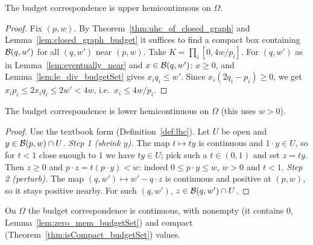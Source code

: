 \begin{theorem}
\label{thm:uhc_budget}
\leanok
{}
The budget correspondence is upper hemicontinuous on $\Omega$.
\end{theorem}
\begin{proof}
\leanok
Fix $(p, w)$. By Theorem~\ref{thm:uhc_of_closed_graph} and Lemma~\ref{lem:closed_graph_budget} it
suffices to find a compact box containing $\mathcal{B}(q, w')$ for all $(q, w')$ near $(p, w)$. Take
$K = \prod_i [0, 4w/p_i]$. For $(q, w')$ as in Lemma~\ref{lem:eventually_near} and $x \in \mathcal{B}(q, w')$:
$x \ge 0$, and Lemma~\ref{lem:le_div_budgetSet} gives $x_i q_i \le w'$. Since
$x_i (2q_i - p_i) \ge 0$, we get $x_i p_i \le 2 x_i q_i \le 2w' < 4w$, i.e.\ $x_i \le 4w/p_i$.
\end{proof}

\begin{theorem}
\label{thm:lhc_budget}
\leanok
{}
The budget correspondence is lower hemicontinuous on $\Omega$ (this uses $w > 0$).
\end{theorem}
\begin{proof}
\leanok
Use the textbook form (Definition~\ref{def:lhc}). Let $U$ be open and $y \in \mathcal{B}(p, w) \cap U$.
\emph{Step 1 (shrink $y$).} The map $t \mapsto t y$ is continuous and $1 \cdot y \in U$, so for $t < 1$
close enough to $1$ we have $t y \in U$; pick such a $t \in (0, 1)$ and set $z = t y$. Then $z \ge 0$
and $p \cdot z = t (p \cdot y) < w$: indeed $0 \le p \cdot y \le w$, $w > 0$ and $t < 1$.
\emph{Step 2 (perturb).} The map $(q, w') \mapsto w' - q \cdot z$ is continuous and positive at
$(p, w)$, so it stays positive nearby. For such $(q, w')$, $z \in \mathcal{B}(q, w') \cap U$.
\end{proof}

\begin{corollary}
\label{cor:budget_berge}
\leanok
{}
On $\Omega$ the budget correspondence is continuous, with nonempty (it contains $0$,
Lemma~\ref{lem:zero_mem_budgetSet}) and compact (Theorem~\ref{thm:isCompact_budgetSet}) values.
\end{corollary}

